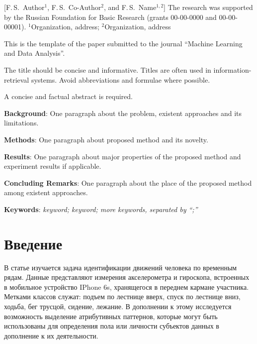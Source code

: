 \documentclass[12pt, twoside]{article}
\begin{document}
    [F.\,S.~Author$^1$, F.\,S.~Co-Author$^2$, and F.\,S.~Name$^{1, 2}$] %
\thanksEng
    {The research was
    	 supported by the Russian Foundation for Basic Research (grants 00-00-0000 and 00-00-00001).
    }
\organizationEng
    {$^1$Organization, address; $^2$Organization, address}
\abstractEng
    {This is the template of the paper submitted to the journal ``Machine Learning and Data Analysis''.
		
	\noindent
	The title should be concise and informative. Titles are often used in information-retrieval systems. Avoid abbreviations and formulae where possible.
	
	\noindent
	A concise and factual abstract is required.
	
	\noindent
	\textbf{Background}: One paragraph about the problem, existent approaches and its limitations.
	
	\noindent
	\textbf{Methods}: One paragraph about proposed method and its novelty.
	
	\noindent
	\textbf{Results}: One paragraph about major properties of the proposed method and experiment results if applicable.
	
	\noindent
	\textbf{Concluding Remarks}: One paragraph about the place of the proposed method among existent approaches.
		
	\noindent
		
	\noindent
    	\textbf{Keywords}: \emph{keyword; keyword; more keywords, separated by ``;''}}


\maketitle
\linenumbers

\section{Введение}
В статье изучается задача идентификации движений человека по временным рядам. Данные представляют измерения акселерометра и гироскопа, встроенных в мобильное устройство IPhone 6s, хранящегося в переднем кармане участника. Метками классов служат: подъем по лестнице вверх, спуск по лестнице вниз, ходьба, бег трусцой, сидение, лежание. В дополнении к этому исследуется возможность выделение атрибутивных паттернов, которые могут быть использованы для определения пола или личности субъектов данных в дополнение к их деятельности.
\end{document}
